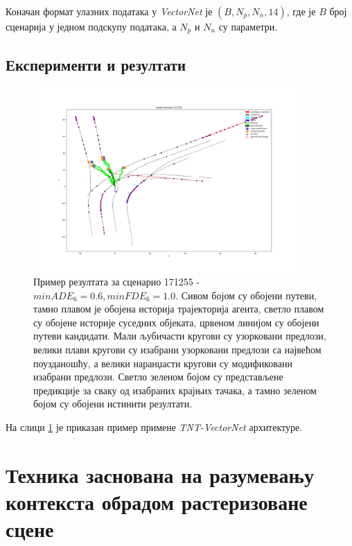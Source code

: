 \documentclass[11pt,oneside]{memoir}
\begin{document}
Коначан формат улазних података у \textit{VectorNet} је $(B, N_{p}, N_{n}, 14)$, где је $B$ број сценарија у једном подскупу података,
а $N_{p}$ и $N_{n}$ су параметри.

\section{Експерименти и резултати}

\begin{figure}[H]
  \centering
  \includegraphics[width=0.9\textwidth]{images/tnt-scenario-171255.png}
  \caption{
    Пример резултата за сценарио 171255 - $minADE_{6} = 0.6, minFDE_{6} = 1.0$. Сивом 
    бојом су обојени путеви, тамно плавом је обојена историја трајекторија агента, светло плавом су обојене историје суседних објеката,
    црвеном линијом су обојени путеви кандидати. Мали љубичасти кругови су узорковани предлози, велики плави кругови су изабрани
    узорковани предлози са највећом поузданошћу, а велики наранџасти кругови су модификовани изабрани предлози. Светло зеленом
    бојом су представљене предикције за сваку од изабраних крајњих тачака, а тамно зеленом бојом су обојени истинити резултати. 
    \label{tnt-scenario-171255}
  }
\end{figure}

На слици \ref{tnt-scenario-171255} је приказан пример примене \textit{TNT-VectorNet} архитектуре. 

\chapter{Техника заснована на разумевању контекста обрадом растеризоване сцене}
\label{chp:razrada}
\end{document}
